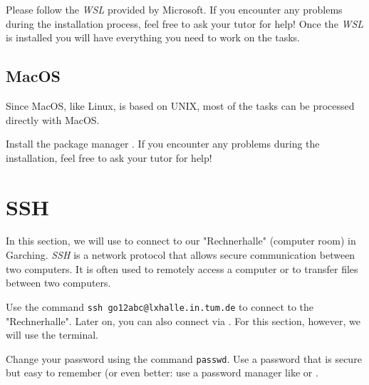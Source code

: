 \documentclass[english]{sheet}
\begin{document}
Please follow the \emph{WSL}  provided by Microsoft. If you encounter any problems during the installation process, feel free to ask your tutor for help! Once the \emph{WSL} is installed you will have everything you need to work on the tasks.

\subsection{MacOS}
Since MacOS, like Linux, is based on UNIX, most of the tasks can be processed directly with MacOS.

Install the package manager . If you encounter any problems during the installation, feel free to ask your tutor for help!

\section{SSH}
In this section, we will use  to connect to our "Rechnerhalle" (computer room) in Garching. \emph{SSH} is a network protocol that allows secure communication between two computers. It is often used to remotely access a computer or to transfer files between two computers. 

\begin{exercise}[subtitle=Establishing a connection]
    Use the command \texttt{ssh go12abc@lxhalle.in.tum.de} to connect to the "Rechnerhalle".
    Later on, you can also connect via . For this section, however, we will use the terminal.
\end{exercise}

\begin{exercise}[subtitle=(*)Change password]
    Change your password using the command \texttt{passwd}. Use a password that is secure but easy to remember (or even better: use a password manager like  or .
\end{exercise}
\end{document}
